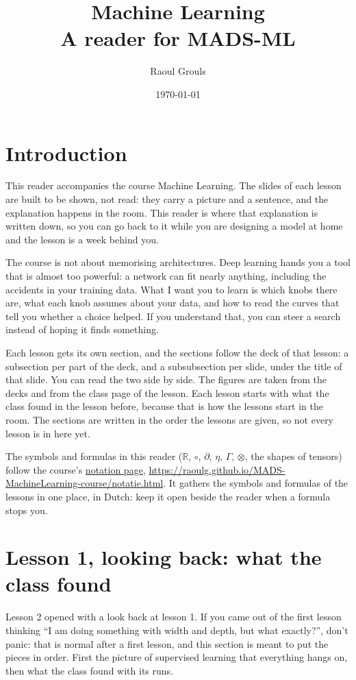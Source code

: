 \documentclass[12pt, a4paper]{article}
\title{Machine Learning\\[0.3em]\large A reader for MADS-ML}
\author{Raoul Grouls}
\date{\today}
\theoremstyle{definition}
\theoremstyle{remark}
\newcommand{\R}{\mathbb{R}}
\newcommand{\notationurl}{https://raoulg.github.io/MADS-MachineLearning-course/notatie.html}
\newcommand{\notationpage}{\href{\notationurl}{notation page}}
\begin{document}
\maketitle
\tableofcontents
\newpage

\section{Introduction}
\label{sec:introduction}
This reader accompanies the course Machine Learning. The slides of each lesson are built to be shown, not read: they carry a picture and a sentence, and the explanation happens in the room. This reader is where that explanation is written down, so you can go back to it while you are designing a model at home and the lesson is a week behind you.

The course is not about memorising architectures. Deep learning hands you a tool that is almost too powerful: a network can fit nearly anything, including the accidents in your training data. What I want you to learn is which knobs there are, what each knob assumes about your data, and how to read the curves that tell you whether a choice helped. If you understand that, you can steer a search instead of hoping it finds something.

Each lesson gets its own section, and the sections follow the deck of that lesson: a subsection per part of the deck, and a subsubsection per slide, under the title of that slide. You can read the two side by side. The figures are taken from the decks and from the class page of the lesson. Each lesson starts with what the class found in the lesson before, because that is how the lessons start in the room. The sections are written in the order the lessons are given, so not every lesson is in here yet.

The symbols and formulas in this reader ($\R$, $\circ$, $\partial$, $\eta$, $\Gamma$, $\otimes$, the shapes of tensors) follow the course's \notationpage, \url{\notationurl}. It gathers the symbols and formulas of the lessons in one place, in Dutch: keep it open beside the reader when a formula stops you.
\newpage

\section{Lesson 1, looking back: what the class found}
\label{sec:lesson1-review}
Lesson 2 opened with a look back at lesson 1. If you came out of the first lesson thinking ``I am doing something with width and depth, but what exactly?'', don't panic: that is normal after a first lesson, and this section is meant to put the pieces in order. First the picture of supervised learning that everything hangs on, then what the class found with its runs.
\end{document}
